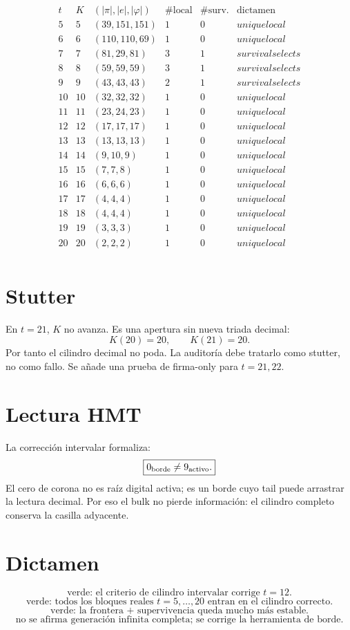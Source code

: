 \documentclass[11pt,a4paper]{article}
\begin{document}
\[
\begin{array}{c|c|c|c|c|c}
t&K&(|\pi|,|e|,|\varphi|)&\#\mathrm{local}&\#\mathrm{surv.}&\mathrm{dictamen}\\
\hline
5 & 5 & (39,151,151) & 1 & 0 & unique local \\
6 & 6 & (110,110,69) & 1 & 0 & unique local \\
7 & 7 & (81,29,81) & 3 & 1 & survival selects \\
8 & 8 & (59,59,59) & 3 & 1 & survival selects \\
9 & 9 & (43,43,43) & 2 & 1 & survival selects \\
10 & 10 & (32,32,32) & 1 & 0 & unique local \\
11 & 11 & (23,24,23) & 1 & 0 & unique local \\
12 & 12 & (17,17,17) & 1 & 0 & unique local \\
13 & 13 & (13,13,13) & 1 & 0 & unique local \\
14 & 14 & (9,10,9) & 1 & 0 & unique local \\
15 & 15 & (7,7,8) & 1 & 0 & unique local \\
16 & 16 & (6,6,6) & 1 & 0 & unique local \\
17 & 17 & (4,4,4) & 1 & 0 & unique local \\
18 & 18 & (4,4,4) & 1 & 0 & unique local \\
19 & 19 & (3,3,3) & 1 & 0 & unique local \\
20 & 20 & (2,2,2) & 1 & 0 & unique local \\
\end{array}
\]

\section{Stutter}

En \(t=21\), \(K\) no avanza. Es una apertura sin nueva triada decimal:
\[
K(20)=20,\qquad K(21)=20.
\]
Por tanto el cilindro decimal no poda. La auditoría debe tratarlo como stutter, no como fallo. Se añade una prueba de firma-only para \(t=21,22\).

\section{Lectura HMT}

La corrección intervalar formaliza:
\[
\boxed{
0_{\rm borde}\neq9_{\rm activo}.
}
\]
El cero de corona no es raíz digital activa; es un borde cuyo tail puede arrastrar la lectura decimal. Por eso el bulk no pierde información: el cilindro completo conserva la casilla adyacente.

\section{Dictamen}

\[
\boxed{
\text{verde: el criterio de cilindro intervalar corrige }t=12.
}
\]
\[
\boxed{
\text{verde: todos los bloques reales }t=5,\ldots,20\text{ entran en el cilindro correcto.}
}
\]
\[
\boxed{
\text{verde: la frontera + supervivencia queda mucho más estable.}
}
\]
\[
\boxed{
\text{no se afirma generación infinita completa; se corrige la herramienta de borde.}
}
\]
\end{document}
